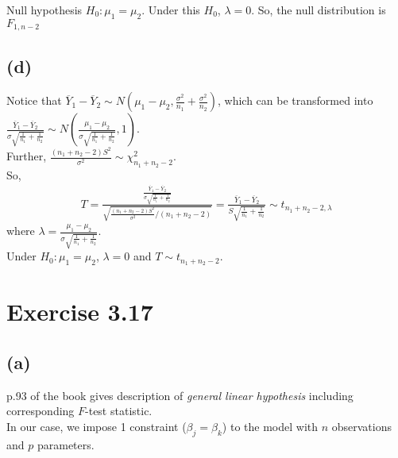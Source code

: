 \documentclass[a4paper]{article}
\begin{document}
Null hypothesis $H_{0}: \mu_{1} = \mu_{2}$. Under this $H_{0}$, $\lambda = 0$.
So, the null distribution is $F_{1,n-2}$


\subsection{(d)}
Notice that $\overline{Y}_{1} - \overline{Y}_{2} \sim N\left(\mu_{1} - \mu_{2}, \frac{\sigma^2}{n_{1}} + \frac{\sigma^2}{n_{2}}\right)$, which can be transformed into $\frac{\overline{Y}_{1} - \overline{Y}_{2}}{\sigma\sqrt{\frac{1}{n_{1}} + \frac{1}{n_{2}}}} \sim N\left(\frac{\mu_{1} - \mu_{2}}{\sigma\sqrt{\frac{1}{n_{1}} + \frac{1}{n_{2}}}}, 1\right)$.\\
Further, $\frac{(n_{1} +n_{2} -2)S^2}{\sigma^2} \sim \chi_{n_{1} +n_{2} -2}^2$.\\

So, 
\begin{align*}
T = \frac{\frac{\overline{Y}_{1} - \overline{Y}_{2}}{\sigma\sqrt{\frac{1}{n_{1}} + \frac{1}{n_{2}}}}}{\sqrt{\frac{(n_{1} +n_{2} -2)S^2}{\sigma^2}/(n_{1} +n_{2} -2)}} = \frac{\overline{Y}_{1} - \overline{Y}_{2}}{S\sqrt{\frac{1}{n_{1}} + \frac{1}{n_{2}}}} \sim t_{n_{1} +n_{2} -2, \lambda}
\end{align*}
where $\lambda = \frac{\mu_{1} - \mu_{2}}{\sigma\sqrt{\frac{1}{n_{1}} + \frac{1}{n_{2}}}}$.\\
Under $H_{0}: \mu_{1} = \mu_{2}$, $\lambda = 0$ and $T \sim t_{n_{1} +n_{2} -2}$.


\vspace{\baselineskip}
\section{Exercise 3.17}
\subsection{(a)}
p.93 of the book gives description of \textit{general linear hypothesis} including corresponding $F$-test statistic.\\
In our case, we impose 1 constraint ($\beta_{j} = \beta_{k}$) to the model with $n$ observations and $p$ parameters.
\end{document}
